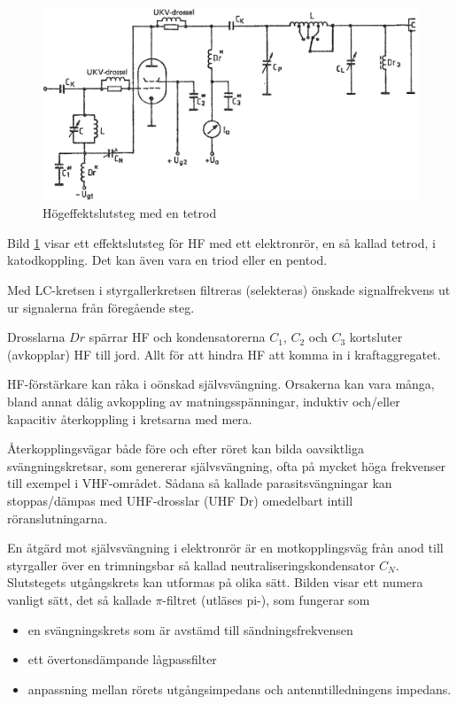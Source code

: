 \begin{figure}
\includegraphics[width=\textwidth]{images/cropped_pdfs/bild_2_3-50.pdf}
\caption{Högeffektslutsteg med en tetrod}
\label{fig:BildII3-50}
\end{figure}

Bild \ref{fig:BildII3-50} visar ett effektslutsteg för HF med ett elektronrör,
en så kallad tetrod, i katodkoppling.
Det kan även vara en triod eller en pentod.

Med LC-kretsen i styrgallerkretsen filtreras (selekteras) önskade
signalfrekvens ut ur signalerna från föregående steg.

Drosslarna \(Dr\) spärrar HF och kondensatorerna \(C_1\), \(C_2\) och
\(C_3\) kortsluter (avkopplar) HF till jord.
Allt för att hindra HF att komma in i kraftaggregatet.

HF-förstärkare kan råka i oönskad självsvängning.
Orsakerna kan vara många, bland annat dålig avkoppling av matningsspänningar,
induktiv och/eller kapacitiv återkoppling i kretsarna med mera.

Återkopplingsvägar både före och efter röret kan bilda oavsiktliga
svängningskretsar, som genererar självsvängning, ofta på mycket höga
frekvenser till exempel i VHF-området.
Sådana så kallade parasitsvängningar kan stoppas/dämpas med UHF-drosslar (UHF
Dr) omedelbart intill röranslutningarna.

En åtgärd mot självsvängning i elektronrör är en motkopplingsväg från anod till
styrgaller över en trimningsbar så kallad neutraliseringskondensator \(C_N\).
Slutstegets utgångskrets kan utformas på olika sätt.
Bilden visar ett numera vanligt sätt, det så kallade \(\pi\)-filtret (utläses
pi-), som fungerar som
\begin{itemize}
  \item en svängningskrets som är avstämd till sändningsfrekvensen
  \item ett övertonsdämpande lågpassfilter
  \item anpassning mellan rörets utgångsimpedans och antenntilledningens impedans.
\end{itemize}

